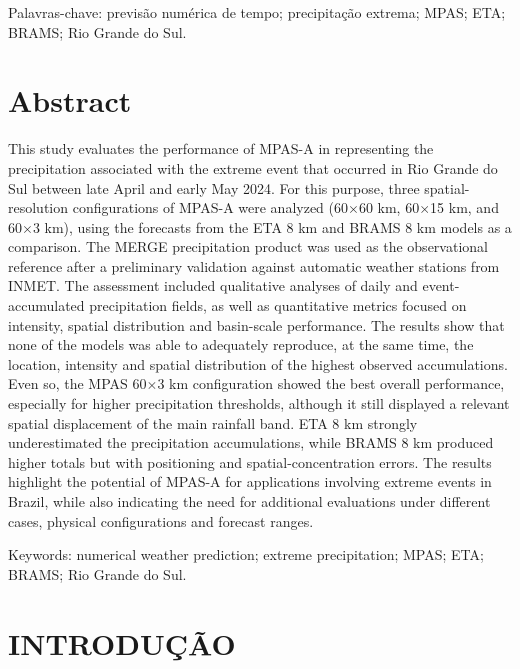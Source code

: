 \documentclass[12pt,a4paper,oneside]{book}
\begin{document}
\bigskip
\noindent Palavras-chave: previsão numérica de tempo; precipitação extrema; MPAS; ETA; BRAMS; Rio Grande do Sul.

\chapter*{Abstract}
This study evaluates the performance of MPAS-A in representing the precipitation associated with the extreme event that occurred in Rio Grande do Sul between late April and early May 2024. For this purpose, three spatial-resolution configurations of MPAS-A were analyzed (60$\times$60 km, 60$\times$15 km, and 60$\times$3 km), using the forecasts from the ETA 8 km and BRAMS 8 km models as a comparison. The MERGE precipitation product was used as the observational reference after a preliminary validation against automatic weather stations from INMET. The assessment included qualitative analyses of daily and event-accumulated precipitation fields, as well as quantitative metrics focused on intensity, spatial distribution and basin-scale performance. The results show that none of the models was able to adequately reproduce, at the same time, the location, intensity and spatial distribution of the highest observed accumulations. Even so, the MPAS 60$\times$3 km configuration showed the best overall performance, especially for higher precipitation thresholds, although it still displayed a relevant spatial displacement of the main rainfall band. ETA 8 km strongly underestimated the precipitation accumulations, while BRAMS 8 km produced higher totals but with positioning and spatial-concentration errors. The results highlight the potential of MPAS-A for applications involving extreme events in Brazil, while also indicating the need for additional evaluations under different cases, physical configurations and forecast ranges.

\bigskip
\noindent Keywords: numerical weather prediction; extreme precipitation; MPAS; ETA; BRAMS; Rio Grande do Sul.

\listoffigures
{}

\listoftables
{}

\tableofcontents
\clearpage
{}

\chapter{INTRODUÇÃO}
\end{document}
